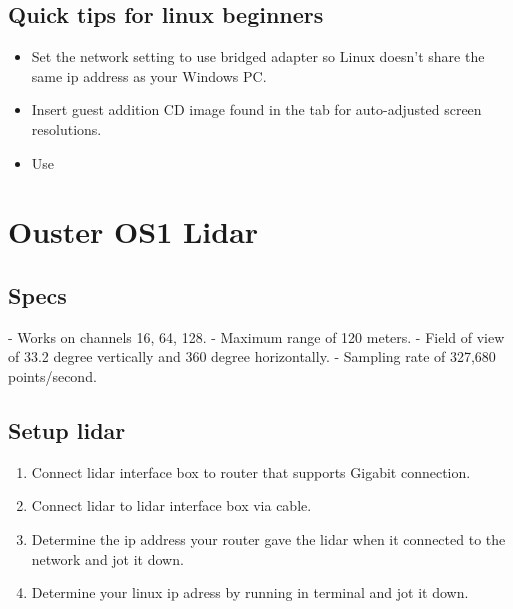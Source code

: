 \documentclass[letterpaper,10pt,english]{sphinxmanual}
\begin{document}
\subsection{Quick tips for linux beginners}
\label{\detokenize{Linux setup:quick-tips-for-linux-beginners}}\begin{itemize}
\item {} 
Set the network setting to use bridged adapter so Linux doesn’t share the same ip address as your Windows PC.

\item {} 
Insert guest addition CD image found in the  tab for auto-adjusted screen resolutions.

\item {} 
Use 

\end{itemize}


\section{Ouster OS1 Lidar}
\label{\detokenize{Ouster lidar:ouster-os1-lidar}}\label{\detokenize{Ouster lidar::doc}}

\subsection{Specs}
\label{\detokenize{Ouster lidar:specs}}
- Works on channels 16, 64, 128.
- Maximum range of 120 meters.
- Field of view of 33.2 degree vertically and 360 degree horizontally.
- Sampling rate of 327,680 points/second.


\subsection{Setup lidar}
\label{\detokenize{Ouster lidar:setup-lidar}}\begin{enumerate}
\def\theenumi{\arabic{enumi}}
\def\labelenumi{\theenumi .}
\makeatletter\def\p@enumii{\p@enumi \theenumi .}\makeatother
\item {} 
Connect lidar interface box to router that supports Gigabit connection.

\item {} 
Connect lidar to lidar interface box via cable.

\item {} 
Determine the ip address your router gave the lidar when it connected to the network and jot it down.

\item {} 
Determine your linux ip adress by running  in terminal and jot it down.

\end{enumerate}
\end{document}
